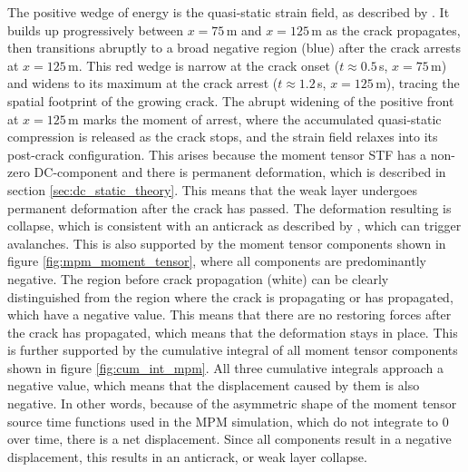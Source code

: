 The positive wedge of energy is the quasi-static strain field, as described by \cite{freundDynamicFractureMechanics1998}. It builds up progressively between $x = 75$\,m and $x = 125$\,m as the crack propagates, then transitions
abruptly to a broad negative region (blue) after the crack arrests at
$x = 125$\,m. This red wedge is narrow at the crack onset ($t \approx
0.5$\,s, $x = 75$\,m) and widens to its maximum at the crack arrest
($t \approx 1.2$\,s, $x = 125$\,m), tracing the spatial footprint of the
growing crack. The abrupt widening of the positive front at $x = 125$\,m
marks the moment of arrest, where the accumulated quasi-static compression is released as the crack stops, and the strain field relaxes into its
post-crack configuration. This arises because the moment tensor STF has a non-zero DC-component and there is permanent deformation, which is described in section \ref{sec:dc_static_theory}. This means that the weak layer undergoes permanent deformation after the crack has passed. The deformation resulting is collapse, which is consistent with an anticrack as described by \cite{heierliAnticrackNucleationTriggering2008,gaumeDynamicAnticrackPropagation2018,trottetTransitionSubRayleighAnticrack2022}, which can trigger avalanches. 
This is also supported by the moment tensor components shown in figure \ref{fig:mpm_moment_tensor}, where all components are predominantly negative. The region before crack propagation (white) can be clearly distinguished from the region where the crack is propagating or has propagated, which have a negative value. This means that there are no restoring forces after the crack has propagated, which means that the deformation stays in place. This is further supported by the cumulative integral of all moment tensor components shown in figure \ref{fig:cum_int_mpm}. All three cumulative integrals approach a negative value, which means that the displacement caused by them is also negative. In other words, because of the asymmetric shape of the moment tensor source time functions used in the MPM simulation, which do not integrate to 0 over time, there is a net displacement. Since all components result in a negative displacement, this results in an anticrack, or weak layer collapse. \par  

